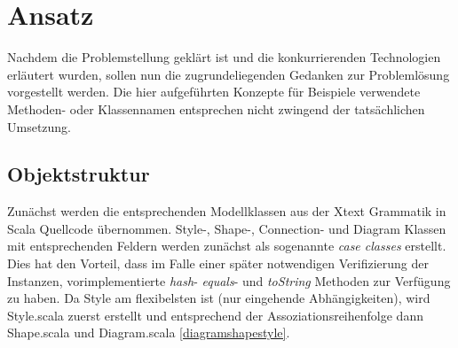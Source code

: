 \chapter{Ansatz}\label{ansatz}
Nachdem die Problemstellung geklärt ist und die konkurrierenden Technologien erläutert wurden, sollen nun die zugrundeliegenden Gedanken zur Problemlösung vorgestellt werden. Die hier aufgeführten Konzepte für Beispiele verwendete Methoden- oder Klassennamen entsprechen nicht zwingend der tatsächlichen Umsetzung.
\section{Objektstruktur}
Zunächst werden die entsprechenden Modellklassen aus der Xtext Grammatik in Scala Quellcode übernommen. Style-, Shape-, Connection- und Diagram Klassen mit entsprechenden Feldern werden zunächst als sogenannte \textit{case classes} erstellt. Dies hat den Vorteil, dass im Falle einer später notwendigen Verifizierung der Instanzen, vorimplementierte \textit{hash}- \textit{equals}- und \textit{toString} Methoden zur Verfügung zu haben. Da Style am flexibelsten ist (nur eingehende Abhängigkeiten), wird Style.scala zuerst erstellt und entsprechend der Assoziationsreihenfolge dann Shape.scala und Diagram.scala \ref{diagramshapestyle}.
